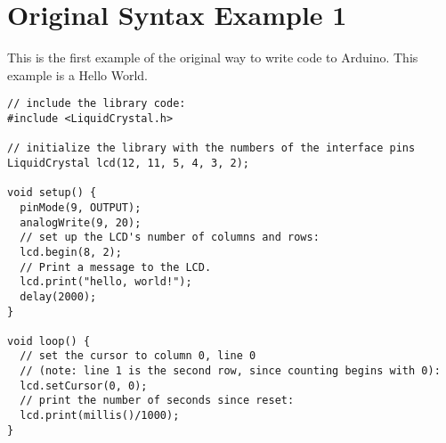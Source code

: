\section{Original Syntax Example 1} \label{first_syntax_example}
This is the first example of the original way to write code to Arduino. This example is a Hello World.
\begin{lstlisting}[caption=This is the first original Arduino example \cite{arduino_hello_world_example}, label=lst:first_syntax_example]
// include the library code:
#include <LiquidCrystal.h>

// initialize the library with the numbers of the interface pins
LiquidCrystal lcd(12, 11, 5, 4, 3, 2);

void setup() {
  pinMode(9, OUTPUT);
  analogWrite(9, 20);
  // set up the LCD's number of columns and rows: 
  lcd.begin(8, 2);
  // Print a message to the LCD.
  lcd.print("hello, world!");
  delay(2000);
}

void loop() {
  // set the cursor to column 0, line 0
  // (note: line 1 is the second row, since counting begins with 0):
  lcd.setCursor(0, 0);
  // print the number of seconds since reset:
  lcd.print(millis()/1000);
}
\end{lstlisting}
